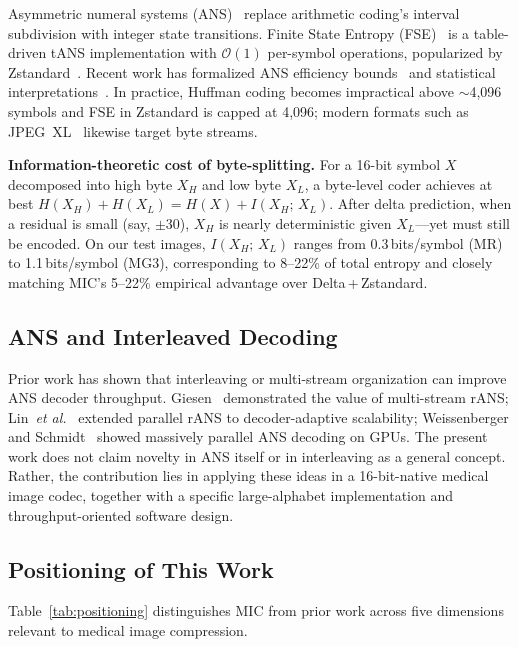 \documentclass[journal]{IEEEtran}
\begin{document}
Asymmetric numeral systems (ANS)~\cite{duda2009,duda2013} replace arithmetic
coding's interval subdivision with integer state transitions. Finite State
Entropy (FSE)~\cite{fse} is a table-driven tANS implementation with
$\mathcal{O}(1)$ per-symbol operations, popularized by Zstandard~\cite{rfc8878}.
Recent work has formalized ANS efficiency bounds~\cite{kosolobov2022} and
statistical interpretations~\cite{bamler2022}. In practice, Huffman coding
becomes impractical above ${\sim}$4,096 symbols and FSE in Zstandard is capped
at 4,096; modern formats such as JPEG~XL~\cite{jpegxl} likewise target byte
streams.

\textbf{Information-theoretic cost of byte-splitting.} For a 16-bit symbol $X$
decomposed into high byte $X_H$ and low byte $X_L$, a byte-level coder
achieves at best $H(X_H)+H(X_L)=H(X)+I(X_H;\,X_L)$. After delta prediction,
when a residual is small (say, $\pm 30$), $X_H$ is nearly deterministic given
$X_L$---yet must still be encoded. On our test images, $I(X_H;\,X_L)$ ranges
from 0.3\,bits/symbol (MR) to 1.1\,bits/symbol (MG3), corresponding to 8--22\%
of total entropy and closely matching MIC's 5--22\% empirical advantage over
Delta\,+\,Zstandard.

\subsection{ANS and Interleaved Decoding}

Prior work has shown that interleaving or multi-stream organization can improve
ANS decoder throughput. Giesen~\cite{giesen2014,giesen2014b} demonstrated the
value of multi-stream rANS; Lin~\textit{et al.}~\cite{lin2023} extended parallel
rANS to decoder-adaptive scalability; Weissenberger and
Schmidt~\cite{weissenberger2019} showed massively parallel ANS decoding on
GPUs. The present work does not claim novelty in ANS itself or in interleaving
as a general concept. Rather, the contribution lies in applying these ideas in a
16-bit-native medical image codec, together with a specific large-alphabet
implementation and throughput-oriented software design.

\subsection{Positioning of This Work}

Table~\ref{tab:positioning} distinguishes MIC from prior work across five
dimensions relevant to medical image compression.
\end{document}
